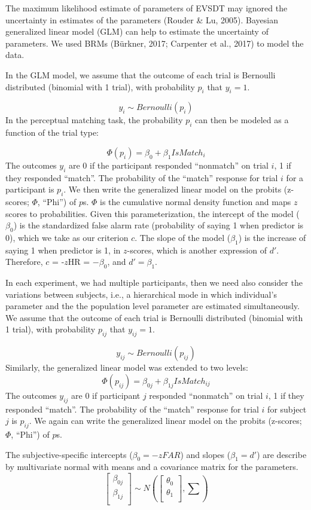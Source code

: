 \documentclass[
  english,
  man]{apa6}
\begin{document}
The maximum likelihood estimate of parameters of EVSDT may ignored the uncertainty in estimates of the parameters (Rouder \& Lu, 2005). Bayesian generalized linear model (GLM) can help to estimate the uncertainty of parameters. We used BRMs (Bürkner, 2017; Carpenter et al., 2017) to model the data.

In the GLM model, we assume that the outcome of each trial is Bernoulli distributed (binomial with 1 trial), with probability \(p_{i}\) that \(y_{i} = 1\).

\[ y_{i} \sim Bernoulli(p_{i})\]
In the perceptual matching task, the probability \(p_{i}\) can then be modeled as a function of the trial type:

\[ \Phi(p_{i}) =  \beta_{0} + \beta_{1}IsMatch_{i}\]
The outcomes \(y_{i}\) are 0 if the participant responded \enquote{nonmatch} on trial \(i\), 1 if they responded \enquote{match}. The probability of the \enquote{match} response for trial \(i\) for a participant is \(p_{i}\). We then write the generalized linear model on the probits (z-scores; \(\Phi\), \enquote{Phi}) of \(p\)s. \(\Phi\) is the cumulative normal density function and maps \(z\) scores to probabilities. Given this parameterization, the intercept of the model (\(\beta_0\)) is the standardized false alarm rate (probability of saying 1 when predictor is 0), which we take as our criterion \(c\). The slope of the model (\(\beta_1\)) is the increase of saying 1 when predictor is 1, in \(z\)-scores, which is another expression of \(d'\). Therefore, \(c\) = -\(z\)HR = \(-\beta_0\), and \(d' = \beta_1\).

In each experiment, we had multiple participants, then we need also consider the variations between subjects, i.e., a hierarchical mode in which individual's parameter and the the population level parameter are estimated simultaneously. We assume that the outcome of each trial is Bernoulli distributed (binomial with 1 trial), with probability \(p_{ij}\) that \(y_{ij} = 1\).

\[ y_{ij} \sim Bernoulli(p_{ij})\]
Similarly, the generalized linear model was extended to two levels:
\[ \Phi(p_{ij}) =  \beta_{0j} + \beta_{1j}IsMatch_{ij}\]
The outcomes \(y_{ij}\) are 0 if participant \(j\) responded \enquote{nonmatch} on trial \(i\), 1 if they responded \enquote{match}. The probability of the \enquote{match} response for trial \(i\) for subject \(j\) is \(p_{ij}\). We again can write the generalized linear model on the probits (z-scores; \(\Phi\), \enquote{Phi}) of \(p\)s.

The subjective-specific intercepts (\(\beta_{0} = -zFAR\)) and slopes (\(\beta_{1} = d'\)) are describe by multivariate normal with means and a covariance matrix for the parameters.
\[ \begin{bmatrix}\beta_{0j}\\
\beta_{1j}\\
\end{bmatrix} \sim N(\begin{bmatrix}\theta_{0}\\
\theta_{1}\\
\end{bmatrix}, \sum) \]
\end{document}
